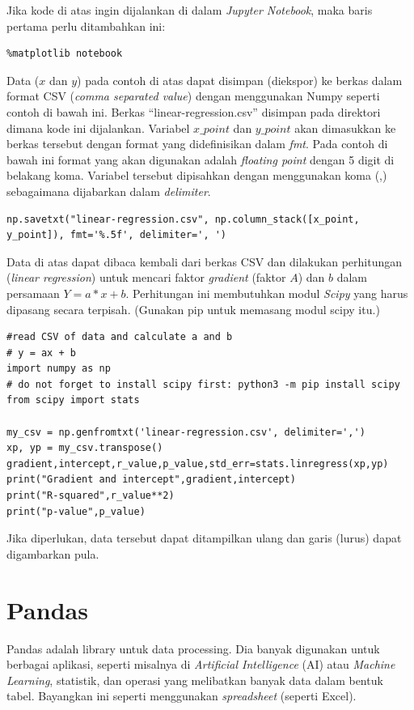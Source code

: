 Jika kode di atas ingin dijalankan di dalam {\em Jupyter Notebook},
maka baris pertama perlu ditambahkan ini:

\begin{verbatim}
%matplotlib notebook
\end{verbatim}

Data ($x$ dan $y$) pada contoh di atas dapat disimpan (diekspor) ke berkas
dalam format CSV ({\em comma separated value}) dengan menggunakan Numpy
seperti contoh di bawah ini.
Berkas ``linear-regression.csv'' disimpan pada direktori dimana kode
ini dijalankan. Variabel $x\_point$ dan $y\_point$ akan dimasukkan ke
berkas tersebut dengan format yang didefinisikan dalam {\em fmt}.
Pada contoh di bawah ini format yang akan digunakan adalah 
{\em floating point} dengan 5 digit di belakang koma.
Variabel tersebut dipisahkan dengan menggunakan koma (,) sebagaimana
dijabarkan dalam {\em delimiter}.

\begin{verbatim}
np.savetxt("linear-regression.csv", np.column_stack([x_point, y_point]), fmt='%.5f', delimiter=', ')
\end{verbatim}

Data di atas dapat dibaca kembali dari berkas CSV dan dilakukan
perhitungan ({\em linear regression}) untuk mencari faktor {\em gradient}
(faktor $A$) dan $b$ dalam persamaan $Y = a*x + b$.
Perhitungan ini membutuhkan modul {\em Scipy} yang harus dipasang
secara terpisah. (Gunakan pip untuk memasang modul scipy itu.)

\begin{verbatim}
#read CSV of data and calculate a and b
# y = ax + b
import numpy as np
# do not forget to install scipy first: python3 -m pip install scipy
from scipy import stats

my_csv = np.genfromtxt('linear-regression.csv', delimiter=',')
xp, yp = my_csv.transpose()
gradient,intercept,r_value,p_value,std_err=stats.linregress(xp,yp)
print("Gradient and intercept",gradient,intercept)
print("R-squared",r_value**2)
print("p-value",p_value)
\end{verbatim}

Jika diperlukan, data tersebut dapat ditampilkan ulang dan garis (lurus)
dapat digambarkan pula.

\section{Pandas}
Pandas adalah library untuk data processing. Dia banyak digunakan untuk
berbagai aplikasi, seperti misalnya di {\em Artificial Intelligence}
(AI) atau {\em Machine Learning}, statistik, dan operasi yang melibatkan
banyak data dalam bentuk tabel.
Bayangkan ini seperti menggunakan {\em spreadsheet} (seperti Excel).

